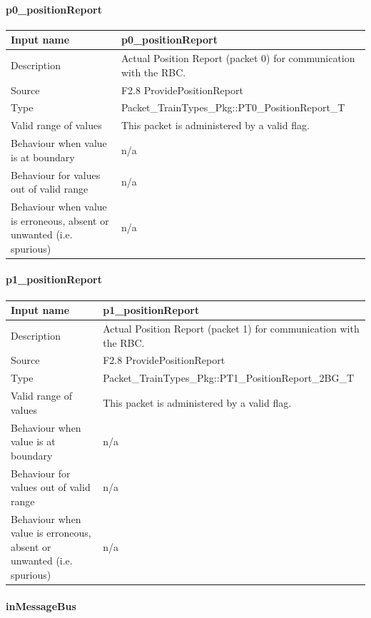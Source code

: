 \paragraph{p0\_positionReport}

\begin{longtable}{p{}p{}}
\toprule
Input name				& p0\_positionReport\\
\midrule
Description				& Actual Position Report (packet 0) for communication with the RBC.
\\
\midrule
Source					& F2.8 ProvidePositionReport\\ 
\midrule
Type					& Packet\_TrainTypes\_Pkg::PT0\_PositionReport\_T\\
\midrule
Valid range of values	& This packet is administered by a valid flag.\\
\midrule
Behaviour when value is at boundary	& n/a\\
\midrule
Behaviour for values out of valid range	& n/a\\
\midrule
Behaviour when value is erroneous, absent or unwanted (i.e. spurious) & n/a\\
\bottomrule
\end{longtable}

\paragraph{p1\_positionReport}

\begin{longtable}{p{}p{}}
\toprule
Input name				& p1\_positionReport\\
\midrule
Description				& Actual Position Report (packet 1) for communication with the RBC.
\\
\midrule
Source					& F2.8 ProvidePositionReport\\  
\midrule
Type					& Packet\_TrainTypes\_Pkg::PT1\_PositionReport\_2BG\_T\\
\midrule
Valid range of values	& This packet is administered by a valid flag.\\
\midrule
Behaviour when value is at boundary	& n/a\\
\midrule
Behaviour for values out of valid range	& n/a\\
\midrule
Behaviour when value is erroneous, absent or unwanted (i.e. spurious) & n/a\\
\bottomrule
\end{longtable}

\paragraph{inMessageBus}

